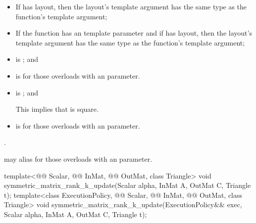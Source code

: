 \pnum
\mandates
\begin{itemize}
\item
If  has  layout,
then the layout's  template argument has
the same type as the function's  template argument;
\item
If the function has an  template parameter and
if  has  layout,
then the layout's  template argument has
the same type as the function's  template argument;
\item
{}
is ; and
\item
{}
is  for those overloads with an  parameter.
\end{itemize}

\pnum
\expects
\begin{itemize}
\item
{}
is ; and
\begin{note}
This implies that  is square.
\end{note}
\item
{}
is  for those overloads with an  parameter.
\end{itemize}

\pnum
\complexity
{}.

\pnum
\remarks
{} may alias  for those overloads with an  parameter.

%
\begin{itemdecl}
  template<@@ Scalar, @@ InMat, @@ OutMat, class Triangle>
    void symmetric_matrix_rank_k_update(Scalar alpha, InMat A, OutMat C, Triangle t);
  template<class ExecutionPolicy, @@ Scalar,
           @@ InMat, @@ OutMat, class Triangle>
    void symmetric_matrix_rank_k_update(ExecutionPolicy&& exec,
                                        Scalar alpha, InMat A, OutMat C, Triangle t);
\end{itemdecl}

